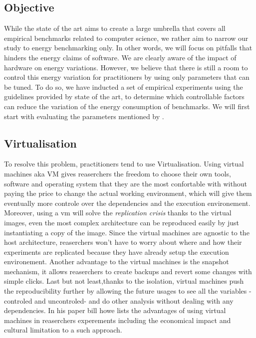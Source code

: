 \subsection*{Objective}
While the state of the art aims to create a large umbrella that covers all empirical benchmarks related to computer science, we rather aim to narrow our study to energy benchmarking only.
In other words, we will focus on pitfalls that hinders the energy claims of software.
We are clearly aware of the impact of hardware on energy variations.
However, we believe that there is still a room to control this energy variation for practitioners by using only parameters that can be tuned.
To do so, we have inducted a set of empirical experiments using the guidelines provided by state of the art, to determine which controllable factors can reduce the variation of the energy consumption of benchmarks.
We will first start with evaluating the parameters mentioned by \cite{heinrich_predicting}.



\subsection{Virtualisation}
To resolve this problem, practitioners tend to use Virtualisation. Using virtual machines aka VM gives reaserchers the freedom to choose their own tools, software and operating system that they are the most confortable with without paying the price to change the actual working environment, which will give them eventually more controle over the dependencies and the execution environement. Moreover, using a vm will solve the \emph{replication crisis} thanks to the virtual images, even the most complex architecture can be reproduced easily by just instantiating a copy of the image. Since the virtual machines are agnostic to the host architecture, reaserchers won't have to worry about where and how their experiments are replicated because they have already setup the execution environement. Another advantage to the virtual machines is the snapshot mechanism, it allows reaserchers to create backups and revert some changes with simple clicks. Last but not least,thanks to the isolation, virtual machines push the reproducibility further by allowing the future usages to see all the variables -controled and uncontroled-  and do other analysis without dealing with any dependencies. In his paper \cite{howe_virtual_2012} bill howe lists the advantages of using virtual machines in reaserchers experements including the economical impact and cultural limitation to a such approach.

